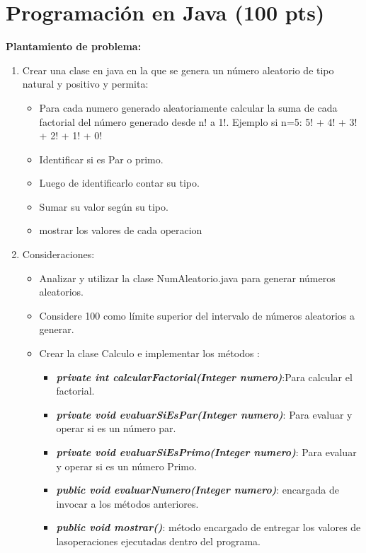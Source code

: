 \documentclass{exam}
\begin{document}
\vspace{-7mm}
\section{\textbf{Programaci\'on en Java (100 pts)}}
\noindent
\textbf{Plantamiento de problema: }

\begin{questions}

  \begin{enumerate}
    \item Crear una clase en java en la que se genera un n\'umero aleatorio de tipo natural y positivo y permita:
\begin{itemize}
    \item Para cada numero generado aleatoriamente calcular la suma de cada factorial  del  n\'umero generado desde n! a 1!. Ejemplo si n=5: 5! + 4! + 3! + 2! + 1! + 0!
    \item Identificar si es Par o primo.
    \item Luego de identificarlo contar su tipo.
    \item Sumar su valor seg\'un su tipo.
    \item mostrar los valores de cada operacion
\end{itemize}
\item Consideraciones:
  \begin{itemize}
    \item Analizar y utilizar la clase NumAleatorio.java para generar n\'umeros aleatorios.
    \item Considere 100 como l\'imite superior del intervalo de n\'umeros aleatorios a generar.
    \item Crear la clase Calculo e implementar los métodos :
    \begin{itemize}
      \item \textit{\textbf{private int calcularFactorial(Integer numero)}}:Para calcular el factorial.
      \item \textit{\textbf{private void evaluarSiEsPar(Integer numero)}}: Para evaluar y operar si es un n\'umero par.
      \item \textit{\textbf{private void evaluarSiEsPrimo(Integer numero)}}: Para evaluar y operar si es un n\'umero Primo.
      \item \textit{\textbf{public void evaluarNumero(Integer numero)}}: encargada de invocar a los m\'etodos anteriores.
      \item \textit{\textbf{public void mostrar()}}: m\'etodo encargado de entregar los valores de lasoperaciones ejecutadas dentro del programa.

\end{itemize}
\end{itemize}
\end{enumerate}
\end{questions}
\end{document}
